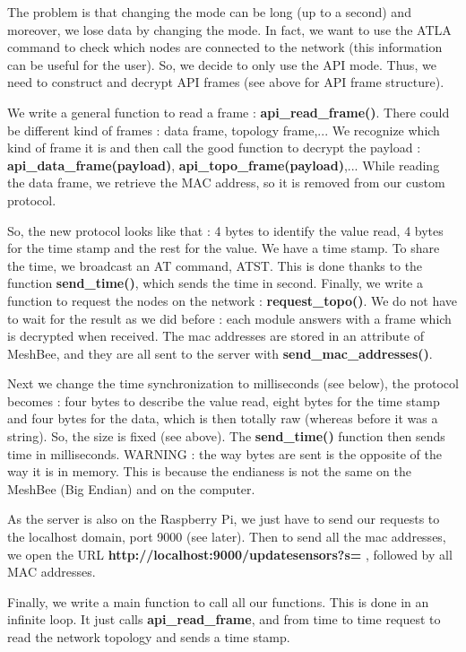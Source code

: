 The problem is that changing the mode can be long (up to a second) and moreover, we lose data by changing the mode. In fact, we want to use the ATLA command to check which nodes are connected to the network (this information can be useful for the user). So, we decide to only use the API mode. Thus, we need to construct and decrypt API frames (see above for API frame structure).

We write a general function to read a frame : \textbf{api\_read\_frame()}. There could be different kind of frames : data frame, topology frame,... We recognize which kind of frame it is and then call the good function to decrypt the payload : \textbf{api\_data\_frame(payload)}, \textbf{api\_topo\_frame(payload)},... While reading the data frame, we retrieve the MAC address, so it is removed from our custom protocol.

So, the new protocol looks like that : 4 bytes to identify the value read, 4 bytes for the time stamp and the rest for the value. We have a time stamp. To share the time, we broadcast an AT command, ATST. This is done thanks to the function \textbf{send\_time()}, which sends the time in second. Finally, we write a function to request the nodes on the network : \textbf{request\_topo()}. We do not have to wait for the result as we did before : each module answers with a frame which is decrypted when received. The mac addresses are stored in an attribute of MeshBee, and they are all sent to the server with \textbf{send\_mac\_addresses()}.

Next we change the time synchronization to milliseconds (see below), the protocol becomes : four bytes to describe the value read, eight bytes for the time stamp and four bytes for the data, which is then totally raw (whereas before it was a string). So, the size is fixed (see above). The \textbf{send\_time()} function then sends time in milliseconds. WARNING : the way bytes are sent is the opposite of the way it is in memory. This is because the endianess is not the same on the MeshBee (Big Endian) and on the computer.

As the server is also on the Raspberry Pi, we just have to send our requests to the localhost domain, port 9000 (see later). Then to send all the mac addresses, we open the URL \textbf{http://localhost:9000/updatesensors?s=} , followed by all MAC addresses.

Finally, we write a main function to call all our functions. This is done in an infinite loop. It just calls \textbf{api\_read\_frame}, and from time to time request to read the network topology and sends a time stamp.

